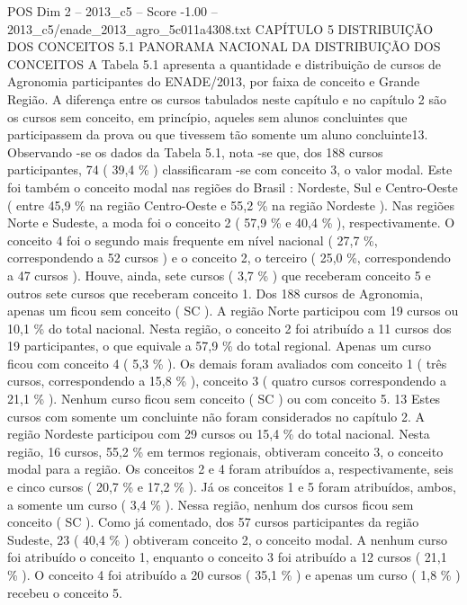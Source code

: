 \begin{textsample}{POS Dim 2 – 2013\_c5 – Score -1.00 – 2013\_c5/enade\_2013\_agro\_5c011a4308.txt}  \label{ex:f2_pos_365}
CAPÍTULO 5 DISTRIBUIÇÃO DOS CONCEITOS 5.1 PANORAMA NACIONAL DA DISTRIBUIÇÃO DOS CONCEITOS A Tabela 5.1 apresenta a quantidade e distribuição de cursos de Agronomia participantes do ENADE/2013, por faixa de conceito e Grande Região.
A diferença entre os cursos tabulados neste capítulo e no capítulo 2 são os cursos sem conceito, em princípio, aqueles sem alunos concluintes que participassem da prova ou que tivessem tão somente um aluno concluinte13.
Observando -se os dados da Tabela 5.1, nota -se que, dos 188 cursos participantes, 74 ( 39,4 \% ) classificaram -se com conceito 3, o valor modal.
Este foi também o conceito modal nas regiões do Brasil : Nordeste, Sul e Centro-Oeste ( entre 45,9 \% na região Centro-Oeste e 55,2 \% na região Nordeste ).
Nas regiões Norte e Sudeste, a moda foi o conceito 2 ( 57,9 \% e 40,4 \% ), respectivamente.
O conceito 4 foi o segundo mais frequente em nível nacional ( 27,7 \%, correspondendo a 52 cursos ) e o conceito 2, o terceiro ( 25,0 \%, correspondendo a 47 cursos ).
Houve, ainda, sete cursos ( 3,7 \% ) que receberam conceito 5 e outros sete cursos que receberam conceito 1.
Dos 188 cursos de Agronomia, apenas um ficou sem conceito ( SC ).
A região Norte participou com 19 cursos ou 10,1 \% do total nacional.
Nesta região, o conceito 2 foi atribuído a 11 cursos dos 19 participantes, o que equivale a 57,9 \% do total regional.
Apenas um curso ficou com conceito 4 ( 5,3 \% ).
Os demais foram avaliados com conceito 1 ( três cursos, correspondendo a 15,8 \% ), conceito 3 ( quatro cursos correspondendo a 21,1 \% ).
Nenhum curso ficou sem conceito ( SC ) ou com conceito 5. 13 Estes cursos com somente um concluinte não foram considerados no capítulo 2.
A região Nordeste participou com 29 cursos ou 15,4 \% do total nacional.
Nesta região, 16 cursos, 55,2 \% em termos regionais, obtiveram conceito 3, o conceito modal para a região.
Os conceitos 2 e 4 foram atribuídos a, respectivamente, seis e cinco cursos ( 20,7 \% e 17,2 \% ).
Já os conceitos 1 e 5 foram atribuídos, ambos, a somente um curso ( 3,4 \% ).
Nessa região, nenhum dos cursos ficou sem conceito ( SC ).
Como já comentado, dos 57 cursos participantes da região Sudeste, 23 ( 40,4 \% ) obtiveram conceito 2, o conceito modal.
A nenhum curso foi atribuído o conceito 1, enquanto o conceito 3 foi atribuído a 12 cursos ( 21,1 \% ).
O conceito 4 foi atribuído a 20 cursos ( 35,1 \% ) e apenas um curso ( 1,8 \% ) recebeu o conceito 5.

\end{textsample}
